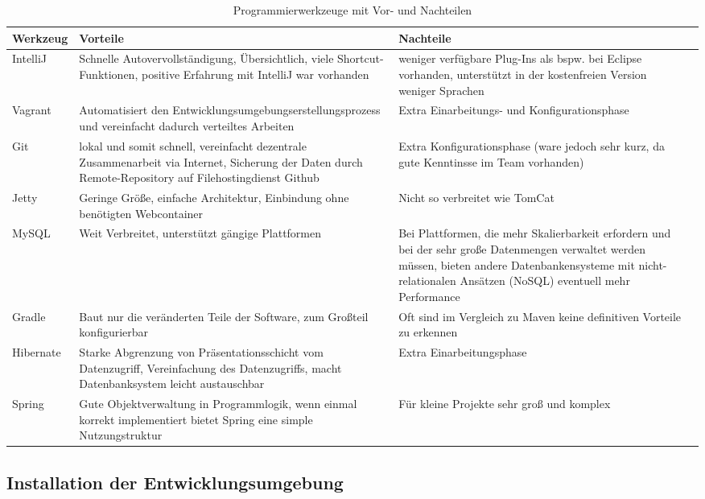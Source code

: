 \documentclass[12pt, oneside, a4paper]{article}		%
\begin{document}
\begin{table}[ht!]
\centering
\begin{tabular}{| p{1.9cm} | p{6.2cm} | p{6.2cm} | l}
\hline                       
\textbf{Werkzeug}	& \textbf{Vorteile}	& \textbf{Nachteile}	\\
\hline
IntelliJ	& Schnelle Autovervollständigung, Übersichtlich, viele Shortcut-Funktionen, positive Erfahrung mit IntelliJ war vorhanden	& weniger verfügbare Plug-Ins als bspw. bei Eclipse vorhanden, unterstützt in der kostenfreien Version weniger Sprachen	\\
\hline
Vagrant	& Automatisiert den Entwicklungsumgebungserstellungsprozess und vereinfacht dadurch verteiltes Arbeiten	& Extra Einarbeitungs- und Konfigurationsphase	\\
\hline
Git	& lokal und somit schnell, vereinfacht dezentrale Zusammenarbeit via Internet, Sicherung der Daten durch Remote-Repository auf Filehostingdienst Github	& Extra Konfigurationsphase	(ware jedoch sehr kurz, da gute Kenntinsse im Team vorhanden)	\\
\hline
Jetty	& Geringe Größe, einfache Architektur, Einbindung ohne benötigten Webcontainer & Nicht so verbreitet wie TomCat	\\
\hline
MySQL	& Weit Verbreitet, unterstützt gängige Plattformen	& Bei Plattformen, die mehr Skalierbarkeit erfordern und bei der sehr große Datenmengen verwaltet werden müssen, bieten andere Datenbankensysteme mit nicht-relationalen Ansätzen (NoSQL) eventuell mehr Performance \\
\hline
Gradle	& Baut nur die veränderten Teile der Software, zum Großteil konfigurierbar	& Oft sind im Vergleich zu Maven keine definitiven Vorteile zu erkennen	\\
\hline
Hibernate	& Starke Abgrenzung von Präsentationsschicht vom Datenzugriff, Vereinfachung des Datenzugriffs, macht Datenbanksystem leicht austauschbar	& Extra Einarbeitungsphase \\
\hline
Spring	& Gute Objektverwaltung in Programmlogik, wenn einmal korrekt implementiert bietet Spring eine simple Nutzungstruktur	& Für kleine Projekte sehr groß und komplex \\
\hline
\end{tabular}
\caption{Programmierwerkzeuge mit Vor- und Nachteilen}
\label{ProgrammierwerkzeugeMitVorUndNachteilen}
\end{table}

\newpage

\subsection{Installation der Entwicklungsumgebung}
\end{document}
